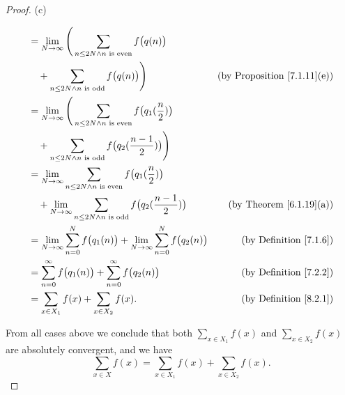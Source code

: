 \begin{proof}{(c)}
\begin{itemize}
\begin{align*}
                   & = \lim_{N \to \infty} \Bigg(\sum_{n \leq 2N \land n \text{ is even}} f\big(q(n)\big)                                                                    \\
                   & \quad + \sum_{n \leq 2N \land n \text{ is odd}} f\big(q(n)\big)\Bigg)                                         & \text{(by Proposition \ref{7.1.11}(e))} \\
                   & = \lim_{N \to \infty} \Bigg(\sum_{n \leq 2N \land n \text{ is even}} f\big(q_1(\frac{n}{2})\big)                                                        \\
                   & \quad + \sum_{n \leq 2N \land n \text{ is odd}} f\big(q_2(\frac{n - 1}{2})\big)\Bigg)                                                                   \\
                   & = \lim_{N \to \infty} \sum_{n \leq 2N \land n \text{ is even}} f\big(q_1(\frac{n}{2})\big)                                                              \\
                   & \quad + \lim_{N \to \infty} \sum_{n \leq 2N \land n \text{ is odd}} f\big(q_2(\frac{n - 1}{2})\big)           & \text{(by Theorem \ref{6.1.19}(a))}     \\
                   & = \lim_{N \to \infty} \sum_{n = 0}^N f\big(q_1(n)\big) + \lim_{N \to \infty} \sum_{n = 0}^N f\big(q_2(n)\big) & \text{(by Definition \ref{7.1.6})}      \\
                   & = \sum_{n = 0}^\infty f\big(q_1(n)\big) + \sum_{n = 0}^\infty f\big(q_2(n)\big)                               & \text{(by Definition \ref{7.2.2})}      \\
                   & = \sum_{x \in X_1} f(x) + \sum_{x \in X_2} f(x).                                                              & \text{(by Definition \ref{8.2.1})}
              \end{align*}
    \end{itemize}
    From all cases above we conclude that both \(\sum_{x \in X_1} f(x)\) and \(\sum_{x \in X_2} f(x)\) are absolutely convergent, and we have
    \[
        \sum_{x \in X} f(x) = \sum_{x \in X_1} f(x) + \sum_{x \in X_2} f(x).
    \]


\end{proof}
